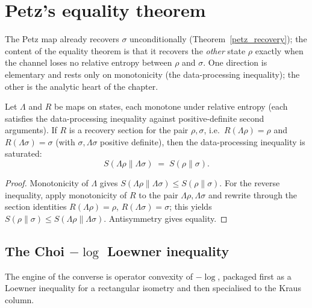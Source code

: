 \section{Petz's equality theorem}
\label{sec:petz-equality}

The Petz map already recovers \(\sigma\) unconditionally (Theorem~\ref{petz_recovery}); the content
of the equality theorem is that it recovers the \emph{other} state \(\rho\) exactly when the channel
loses no relative entropy between \(\rho\) and \(\sigma\). One direction is elementary and rests only
on monotonicity (the data-processing inequality); the other is the analytic heart of the chapter.

\begin{theorem}\label{petz_recovery_implies_equality}
  \leanok
  Let \(\Lambda\) and \(R\) be maps on states, each monotone under relative entropy (each satisfies
  the data-processing inequality against positive-definite second arguments). If \(R\) is a recovery
  section for the pair \(\rho,\sigma\), i.e.\ \(R(\Lambda\rho)=\rho\) and \(R(\Lambda\sigma)=\sigma\)
  (with \(\sigma,\Lambda\sigma\) positive definite), then the data-processing inequality is
  saturated:
  \[
    S(\Lambda\rho\|\Lambda\sigma) \;=\; S(\rho\|\sigma).
  \]
\end{theorem}
\begin{proof}\leanok
  Monotonicity of \(\Lambda\) gives \(S(\Lambda\rho\|\Lambda\sigma)\le S(\rho\|\sigma)\). For the
  reverse inequality, apply monotonicity of \(R\) to the pair \(\Lambda\rho,\Lambda\sigma\) and
  rewrite through the section identities \(R(\Lambda\rho)=\rho\), \(R(\Lambda\sigma)=\sigma\); this
  yields \(S(\rho\|\sigma)\le S(\Lambda\rho\|\Lambda\sigma)\). Antisymmetry gives equality.
\end{proof}

\subsection{The Choi \(-\log\) Loewner inequality}

The engine of the converse is operator convexity of \(-\log\), packaged first as a Loewner
inequality for a rectangular isometry and then specialised to the Kraus column.

